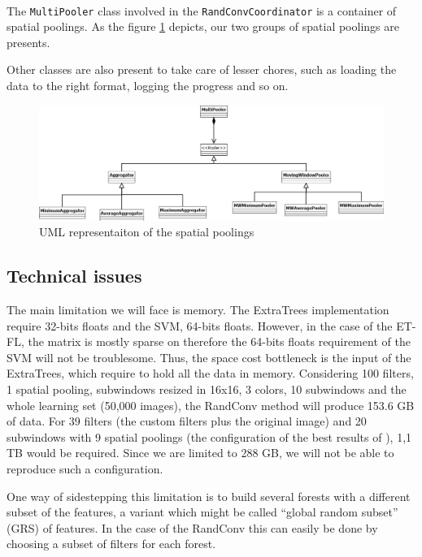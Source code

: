 \documentclass[a4paper]{report}
\begin{document}
		
		\paragraph{}
		The \texttt{MultiPooler} class involved in the \texttt{RandConvCoordinator} is a container of spatial poolings. As the figure \ref{fig:uml-pooling} depicts, our two groups of spatial poolings are presents.
		\par
		Other classes are also present to take care of lesser chores, such as loading the data to the right format, logging the progress and so on.
		
		
		\begin{figure}
			\centering
				\includegraphics[width=1.00\textwidth]{images/uml-pooling.png}
			\caption{UML representaiton of the spatial poolings}
			\label{fig:uml-pooling}
		\end{figure}
			
		
		\subsection{\label{sub:TechnicalIssues}Technical issues}
		The main limitation we will face is memory. The ExtraTrees implementation require 32-bits floats and the SVM, 64-bits floats. However, in the case of the ET-FL, the matrix is mostly sparse on therefore the 64-bits floats requirement of the SVM will not be troublesome. Thus, the space cost bottleneck is the input of the ExtraTrees, which require to hold all the data in memory. Considering 100 filters, 1 spatial pooling, subwindows resized in 16x16, 3 colors, 10 subwindows and the whole learning set (50,000 images), the RandConv method will produce 153.6 GB of data. For 39 filters (the custom filters plus the original image) and 20 subwindows with 9 spatial poolings (the configuration of the best results of \cite{base}), 1,1 TB would be required. Since we are limited to 288 GB, we will not be able to reproduce such a configuration.
		\par
		One way of sidestepping this limitation is to build several forests with a different subset of the features, a variant which might be called ``global random subset'' (GRS) of features. 
		In the case of the RandConv this can easily be done by choosing a subset of filters for each forest.
		
\end{document}
